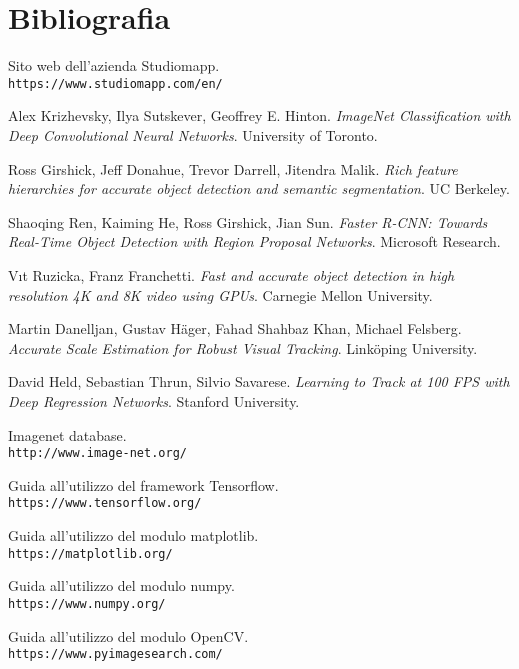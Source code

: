 \section{Bibliografia}

\begin{thebibliography}{99}

Sito web dell'azienda Studiomapp.
\\\texttt{https://www.studiomapp.com/en/}
 
Alex Krizhevsky, Ilya Sutskever, Geoffrey E. Hinton.
\textit{ImageNet Classification with Deep Convolutional
Neural Networks}. University of Toronto. 
 
Ross Girshick, Jeff Donahue, Trevor Darrell, Jitendra Malik.
\textit{Rich feature hierarchies for accurate object detection and semantic segmentation}. UC Berkeley. 
 
Shaoqing Ren, Kaiming He, Ross Girshick, Jian Sun.
\textit{Faster R-CNN: Towards Real-Time Object Detection
with Region Proposal Networks}. Microsoft Research.
 
Vıt Ruzicka, Franz Franchetti.
\textit{Fast and accurate object detection in high resolution 4K and 8K video using GPUs}. Carnegie Mellon University.

Martin Danelljan, Gustav Häger, Fahad Shahbaz Khan, Michael Felsberg.
\textit{Accurate Scale Estimation for
Robust Visual Tracking}. Linköping University.

David Held, Sebastian Thrun, Silvio Savarese.
\textit{Learning to Track at 100 FPS with Deep Regression Networks}. Stanford University.

Imagenet database.
\\\texttt{http://www.image-net.org/}

Guida all'utilizzo del framework Tensorflow.
\\\texttt{https://www.tensorflow.org/}

Guida all'utilizzo del modulo matplotlib.
\\\texttt{https://matplotlib.org/}

Guida all'utilizzo del modulo numpy.
\\\texttt{https://www.numpy.org/}

Guida all'utilizzo del modulo OpenCV.
\\\texttt{https://www.pyimagesearch.com/}


\end{thebibliography}
